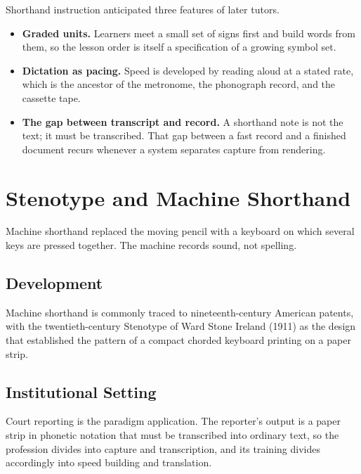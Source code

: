 Shorthand instruction anticipated three features of later tutors.

\begin{itemize}
\item \textbf{Graded units.} Learners meet a small set of signs first and build words from them, so the lesson order is itself a specification of a growing symbol set.
\item \textbf{Dictation as pacing.} Speed is developed by reading aloud at a stated rate, which is the ancestor of the metronome, the phonograph record, and the cassette tape.
\item \textbf{The gap between transcript and record.} A shorthand note is not the text; it must be transcribed. That gap between a fast record and a finished document recurs whenever a system separates capture from rendering.
\end{itemize}

\chapter{Stenotype and Machine Shorthand}

Machine shorthand replaced the moving pencil with a keyboard on which several keys are pressed together. The machine records sound, not spelling.

\section{Development}

Machine shorthand is commonly traced to nineteenth-century American patents, with the twentieth-century Stenotype of Ward Stone Ireland (1911) as the design that established the pattern of a compact chorded keyboard printing on a paper strip. 

\section{Institutional Setting}

Court reporting is the paradigm application. The reporter's output is a paper strip in phonetic notation that must be transcribed into ordinary text, so the profession divides into capture and transcription, and its training divides accordingly into speed building and translation. 

